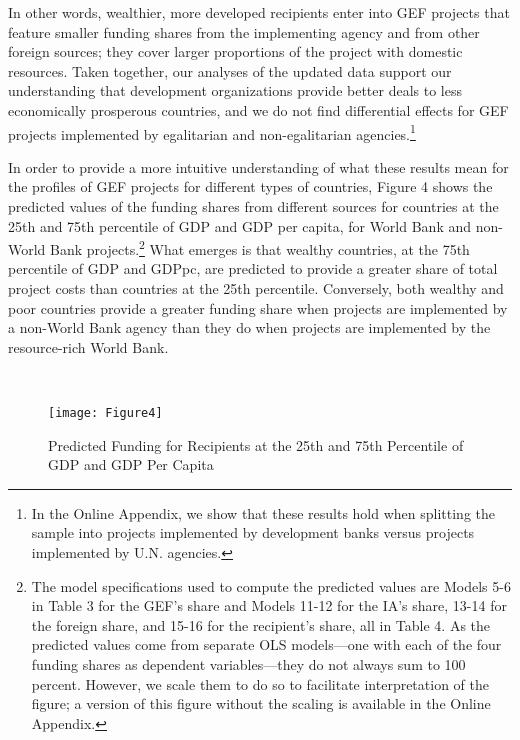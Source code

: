 \documentclass{article}
\begin{document}
In other words, wealthier, more developed recipients enter into GEF projects that feature smaller funding shares from the implementing agency and from other foreign sources; they cover larger proportions of the project with domestic resources.  Taken together, our analyses of the updated data support our understanding that development organizations provide better deals to less economically prosperous countries, and we do not find differential effects for GEF projects implemented by egalitarian and non-egalitarian agencies.\footnote{In the Online Appendix, we show that these results hold when splitting the sample into projects implemented by development banks versus projects implemented by U.N. agencies.} 

In order to provide a more intuitive understanding of what these results mean for the profiles of GEF projects for different types of countries, Figure 4 shows the predicted values of the funding shares from different sources for countries at the 25th and 75th percentile of GDP and GDP per capita, for World Bank and non-World Bank projects.\footnote{The model specifications used to compute the predicted values are Models 5-6 in Table 3 for the GEF’s share and Models 11-12 for the IA’s share, 13-14 for the foreign share, and 15-16 for the recipient’s share, all in Table 4. As the predicted values come from separate OLS models---one with each of the four funding shares as dependent variables---they do not always sum to 100 percent. However, we scale them to do so to facilitate interpretation of the figure; a version of this figure without the scaling is available in the Online Appendix.}  What emerges is that wealthy countries, at the 75th percentile of GDP and GDPpc, are predicted to provide a greater share of total project costs than countries at the 25th percentile. Conversely, both wealthy and poor countries provide a greater funding share when projects are implemented by a non-World Bank agency than they do when projects are implemented by the resource-rich World Bank.  

\

\begin{figure}[H]
	\centering
	\caption{Predicted Funding for Recipients at the 25th and 75th Percentile of GDP and GDP Per Capita}
	\texttt{[image: Figure4]}
	\label{fig:figure4}
\end{figure}
\end{document}
